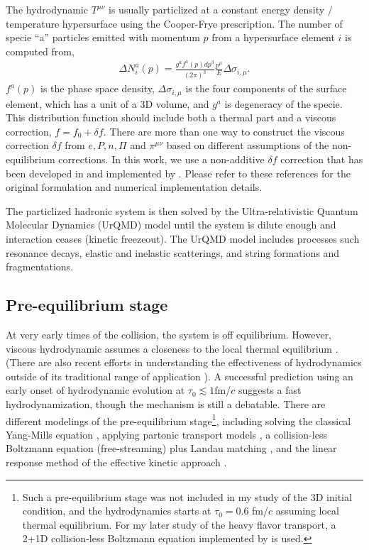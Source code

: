 The hydrodynamic $T^{\mu\nu}$ is usually particlized at a constant energy density / temperature hypersurface using the Cooper-Frye prescription.
The number of specie ``a'' particles emitted with momentum $p$ from a hypersurface element $i$ is computed from,
\begin{eqnarray}
\Delta N_i^a(p) = \frac{g^a f^a(p) dp^3}{(2\pi)^3}  \frac{p^{\mu}}{E} \Delta \sigma_{i,\mu}.
\end{eqnarray}
$f^a(p)$ is the phase space density, $\Delta \sigma_{i,\mu}$ is the four components of the surface element, which has a unit of a 3D volume, and $g^a$ is degeneracy of the specie.
This distribution function should include both a thermal part and a viscous correction, $f = f_0 + \delta f$.
There are more than one way to construct the viscous correction $\delta f$  from $e, P, n, \Pi$ and $\pi^{\mu\nu}$ based on different assumptions of the non-equilibrium corrections.
In this work, we use a non-additive $\delta f$ correction that has been developed in \cite{Pratt:2010jt,Pratt:2014vja} and implemented by \cite{Bernhard:2018hnz}.
Please refer to these references for the original formulation and numerical implementation details.

The particlized hadronic system is then solved by the Ultra-relativistic Quantum Molecular Dynamics (UrQMD) model \cite{Bass:1998ca,Bleicher:1999xi} until the system is dilute enough and interaction ceases (kinetic freezeout). 
The UrQMD model includes processes such resonance decays, elastic and inelastic scatterings, and string formations and fragmentations.

\subsection{Pre-equilibrium stage}
At very early times of the collision, the system is off equilibrium. 
However, viscous hydrodynamic assumes a closeness to the local thermal equilibrium . (There are also recent efforts in understanding the effectiveness of hydrodynamics outside of its traditional range of application \cite{PhysRevLett.115.072501,Romatschke:2017vte,Strickland:2019jut}).
A successful prediction using an early onset of hydrodynamic evolution at $\tau_0\lesssim 1$fm/$c$ suggests a fast hydrodynamization, though the mechanism is still a debatable. 
There are different modelings of the pre-equilibrium stage\footnote{Such a pre-equilibrium stage was not included in my study of the 3D initial condition, and the hydrodynamics starts at $\tau_0 = 0.6$ fm/$c$ assuming local thermal equilibrium. For my later study of the heavy flavor transport, a 2+1D collision-less Boltzmann equation implemented by \cite{Bernhard:2018hnz} is used.}, including solving the classical Yang-Mills equation \cite{Schenke:2012wb,Schenke:2016ksl}, applying partonic transport models \cite{PhysRevC.97.034915}, a collision-less Boltzmann equation (free-streaming) plus Landau matching \cite{Liu:2015nwa}, and the linear response method of the effective kinetic approach \cite{Kurkela:2018wud}.

